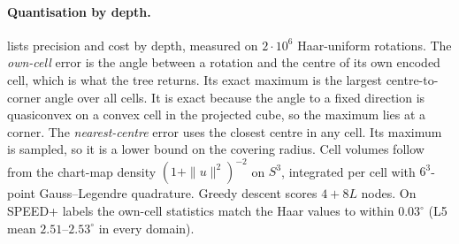 \paragraph{Quantisation by depth.}
 lists precision and cost by depth, measured on $2\cdot10^6$ Haar-uniform rotations. The \emph{own-cell} error is the angle between a rotation and the centre of its own encoded cell, which is what the tree returns. Its exact maximum is the largest centre-to-corner angle over all cells. It is exact because the angle to a fixed direction is quasiconvex on a convex cell in the projected cube, so the maximum lies at a corner. The \emph{nearest-centre} error uses the closest centre in any cell. Its maximum is sampled, so it is a lower bound on the covering radius. Cell volumes follow from the chart-map density $(1+\|u\|^2)^{-2}$ on $S^3$, integrated per cell with $6^3$-point Gauss--Legendre quadrature. Greedy descent scores $4+8L$ nodes. On SPEED+ labels the own-cell statistics match the Haar values to within $0.03^\circ$ (L5 mean $2.51$--$2.53^\circ$ in every domain).

\begin{table}[t]
  \centering\footnotesize
  \caption{\textbf{Tesseract precision and cost by depth} ($2\cdot10^6$ Haar rotations). Own-cell: distance to the centre of the encoded cell (the tree's output); the maximum is the exact centre-to-corner bound. Nearest: distance to the closest centre in any cell (sampled maximum). ``Not own'': fraction of rotations whose nearest centre is not in their own cell. Volume ratio and CV are exact. Spacing is each centre's nearest-neighbour distance.}
  \label{tab:app_depth}
\end{table}


